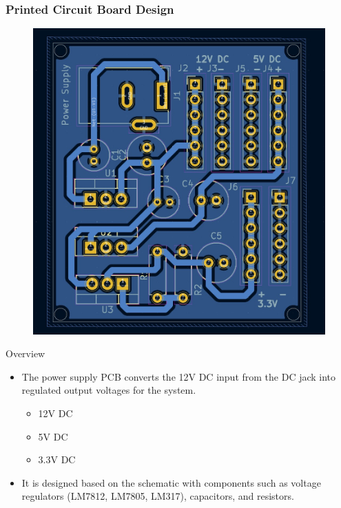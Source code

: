 \documentclass[8pt,compress]{beamer}
\begin{document}
\begin{frame}
  \frametitle{Printed Circuit Board Design}
  \begin{minipage}{0.3\textwidth}
    \begin{figure}
      \includegraphics[width=\textwidth]{assets/electronic/pwrsupply_pcb.jpg}
    \end{figure}
  \end{minipage}
  \hfill
  \begin{minipage}{0.675\textwidth}
    \begin{block}{Overview}
      \begin{itemize}
          \small
        \item The power supply PCB converts the 12V DC input from the DC jack into regulated output voltages for the system.
          \begin{itemize}
              \tiny
            \item  12V DC
            \item 5V DC
            \item 3.3V DC
          \end{itemize}
        \item It is designed based on the schematic with components such as voltage regulators (LM7812, LM7805, LM317), capacitors, and resistors.

\end{itemize}
\end{block}
\end{minipage}
\end{frame}
\end{document}
